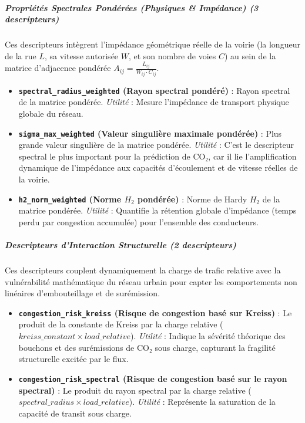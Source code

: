 \documentclass[10pt, a4paper]{article}
\providecommand{\tightlist}{}
\begin{document}
\subparagraph{Propriétés Spectrales Pondérées (Physiques \& Impédance)
(3
descripteurs)}\label{propriuxe9tuxe9s-spectrales-ponduxe9ruxe9es-physiques-impuxe9dance-3-descripteurs}

Ces descripteurs intègrent l'impédance géométrique réelle de la voirie
(la longueur de la rue \(L\), sa vitesse autorisée \(W\), et son nombre
de voies \(C\)) au sein de la matrice d'adjacence pondérée
\(A_{ij} = \frac{L_{ij}}{W_{ij} \cdot C_{ij}}\).

\begin{itemize}
\tightlist
\item
  \textbf{\texttt{spectral\_radius\_weighted} (Rayon spectral pondéré)}
  : Rayon spectral de la matrice pondérée. \emph{Utilité} : Mesure
  l'impédance de transport physique globale du réseau.
\item
  \textbf{\texttt{sigma\_max\_weighted} (Valeur singulière maximale
  pondérée)} : Plus grande valeur singulière de la matrice pondérée.
  \emph{Utilité} : C'est le descripteur spectral le plus important pour
  la prédiction de CO₂, car il lie l'amplification dynamique de
  l'impédance aux capacités d'écoulement et de vitesse réelles de la
  voirie.
\item
  \textbf{\texttt{h2\_norm\_weighted} (Norme \(H_2\) pondérée)} : Norme
  de Hardy \(H_2\) de la matrice pondérée. \emph{Utilité} : Quantifie la
  rétention globale d'impédance (temps perdu par congestion accumulée)
  pour l'ensemble des conducteurs.
\end{itemize}

\subparagraph{Descripteurs d'Interaction Structurelle (2
descripteurs)}\label{descripteurs-dinteraction-structurelle-2-descripteurs}

Ces descripteurs couplent dynamiquement la charge de trafic relative
avec la vulnérabilité mathématique du réseau urbain pour capter les
comportements non linéaires d'embouteillage et de surémission.

\begin{itemize}
\tightlist
\item
  \textbf{\texttt{congestion\_risk\_kreiss} (Risque de congestion basé
  sur Kreiss)} : Le produit de la constante de Kreiss par la charge
  relative (\(kreiss\_constant \times load\_relative\)). \emph{Utilité}
  : Indique la sévérité théorique des bouchons et des surémissions de
  CO₂ sous charge, capturant la fragilité structurelle excitée par le
  flux.
\item
  \textbf{\texttt{congestion\_risk\_spectral} (Risque de congestion basé
  sur le rayon spectral)} : Le produit du rayon spectral par la charge
  relative (\(spectral\_radius \times load\_relative\)). \emph{Utilité}
  : Représente la saturation de la capacité de transit sous charge.
\end{itemize}
\end{document}
